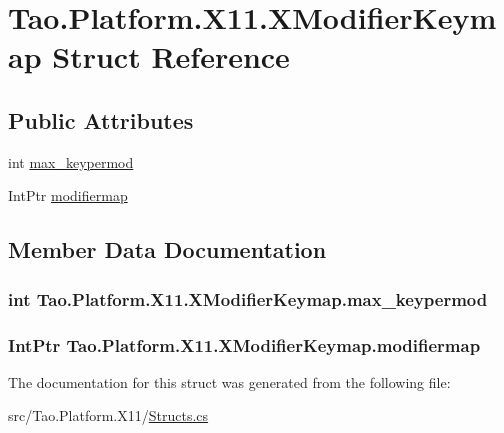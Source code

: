 \hypertarget{struct_tao_1_1_platform_1_1_x11_1_1_x_modifier_keymap}{
\section{Tao.Platform.X11.XModifierKeymap Struct Reference}
\label{struct_tao_1_1_platform_1_1_x11_1_1_x_modifier_keymap}
}
\subsection*{Public Attributes}
\begin{DoxyCompactItemize}
\item 
int \hyperlink{struct_tao_1_1_platform_1_1_x11_1_1_x_modifier_keymap_a4916e74cfd93030068ae93ba38104bf6}{max\_\-keypermod}
\item 
IntPtr \hyperlink{struct_tao_1_1_platform_1_1_x11_1_1_x_modifier_keymap_a87e483b7b9b619a0f7d96fd48cc478c4}{modifiermap}
\end{DoxyCompactItemize}


\subsection{Member Data Documentation}
\hypertarget{struct_tao_1_1_platform_1_1_x11_1_1_x_modifier_keymap_a4916e74cfd93030068ae93ba38104bf6}{
\subsubsection[{max\_\-keypermod}]{\setlength{\rightskip}{0pt plus 5cm}int {\bf Tao.Platform.X11.XModifierKeymap.max\_\-keypermod}}}
\label{struct_tao_1_1_platform_1_1_x11_1_1_x_modifier_keymap_a4916e74cfd93030068ae93ba38104bf6}
\hypertarget{struct_tao_1_1_platform_1_1_x11_1_1_x_modifier_keymap_a87e483b7b9b619a0f7d96fd48cc478c4}{
\subsubsection[{modifiermap}]{\setlength{\rightskip}{0pt plus 5cm}IntPtr {\bf Tao.Platform.X11.XModifierKeymap.modifiermap}}}
\label{struct_tao_1_1_platform_1_1_x11_1_1_x_modifier_keymap_a87e483b7b9b619a0f7d96fd48cc478c4}


The documentation for this struct was generated from the following file:\begin{DoxyCompactItemize}
\item 
src/Tao.Platform.X11/\hyperlink{_structs_8cs}{Structs.cs}\end{DoxyCompactItemize}
